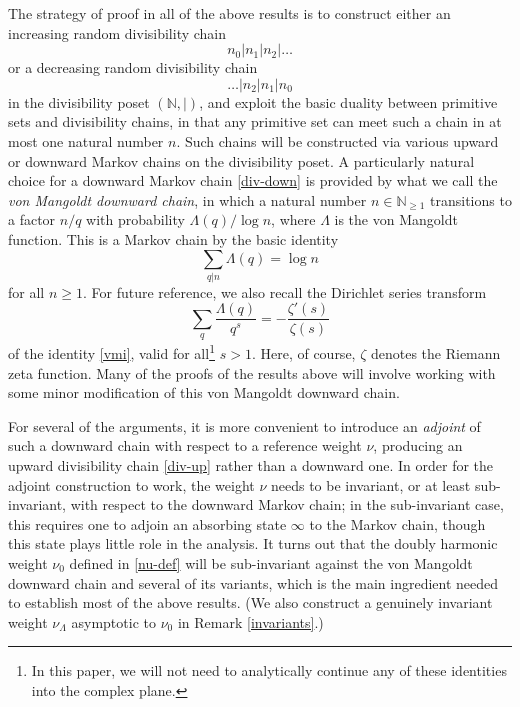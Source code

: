 \documentclass[12pt]{amsart}
\theoremstyle{definition}
\theoremstyle{remark}
\numberwithin{equation}{section}
\newcommand{\N}{{\mathbb N}}
\newcommand{\Lam}{\Lambda}
\newcommand{\nuMangoldt}{\nu_{\Lambda}}
\newcommand{\1}{{\mathbf 1}}
\begin{document}
The strategy of proof in all of the above results is to construct either an increasing random divisibility chain
\begin{equation}\label{div-up}
 n_0 | n_1 | n_2 | \dots
 \end{equation}
or a decreasing random divisibility chain
\begin{equation}\label{div-down}
\dots | n_2 | n_1 | n_0
\end{equation}
in the divisibility poset $(\N,|)$, and exploit the basic duality between primitive sets and divisibility chains, in that any primitive set can meet such a chain in at most one natural number $n$.  Such chains will be constructed via various upward or downward Markov chains on the divisibility poset. A particularly natural choice for a downward Markov chain \eqref{div-down} is provided by what we call the \emph{von Mangoldt downward chain}, in which a natural number $n \in \N_{\geq 1}$ transitions to a factor $n/q$ with probability $\Lambda(q)/\log n$, where $\Lambda$ is the von Mangoldt function.  This is a Markov chain by the basic identity
\begin{equation}\label{vmi}
\sum_{q|n} \Lambda(q) = \log n
\end{equation}
for all $n \geq 1$.  For future reference, we also recall the Dirichlet series transform
\begin{equation}\label{lam-s}
\sum_{q}\frac{\Lam(q)}{q^s}
=-\frac{\zeta'(s)}{\zeta(s)}
\end{equation}
of the identity \eqref{vmi}, valid for all\footnote{In this paper, we will not need to analytically continue any of these identities into the complex plane.} $s>1$.  Here, of course, $\zeta$ denotes the Riemann zeta function.  Many of the proofs of the results above will involve working with some minor modification of this von Mangoldt downward chain.

For several of the arguments, it is more convenient to introduce an \emph{adjoint} of such a downward chain with respect to a reference weight $\nu$, producing an upward divisibility chain \eqref{div-up} rather than a downward one.  In order for the adjoint construction to work, the 
weight $\nu$ needs to be invariant, or at least sub-invariant, with respect to the downward Markov chain; in the sub-invariant case, this requires one to adjoin an absorbing state $\infty$ to the Markov chain, though this state plays little role in the analysis.  It turns out that the doubly harmonic weight $\nu_0$ defined in \eqref{nu-def} will be sub-invariant against the von Mangoldt downward chain and several of its variants, which is the main ingredient needed to establish most of the above results. (We also construct a genuinely invariant weight $\nuMangoldt$ asymptotic to $\nu_0$ in Remark \ref{invariants}.)
\end{document}
